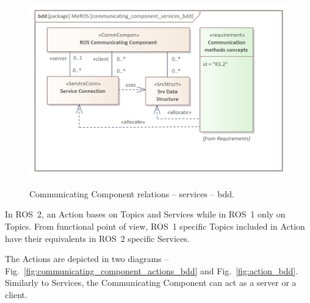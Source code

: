 \documentclass[11pt,oneside,a4paper]{article}
\begin{document}
	\begin{figure}[H]
		\centering
		\begin{center}
			{\includegraphics[scale=1.0]{img/meros_pkg/communicating_component_services_bdd.png}}
		\end{center}
		\caption{Communicating Component relations -- services -- bdd.} 
		\label{fig:communication_blocks_services_bdd}
	\end{figure}
	
	In ROS~2, an Action bases on Topics and Services while in ROS~1 only on Topics. From functional point of view, ROS~1 specific Topics included in Action have their equivalents in ROS~2 specific Services. 
	
	\pagebreak
	
	The Actions are depicted in two diagrams -- Fig.~\ref{fig:communicating_component_actions_bdd} and Fig.~\ref{fig:action_bdd}. Similarly to Services, the Communicating Component can act as a server or a client.	 
	
\end{document}

